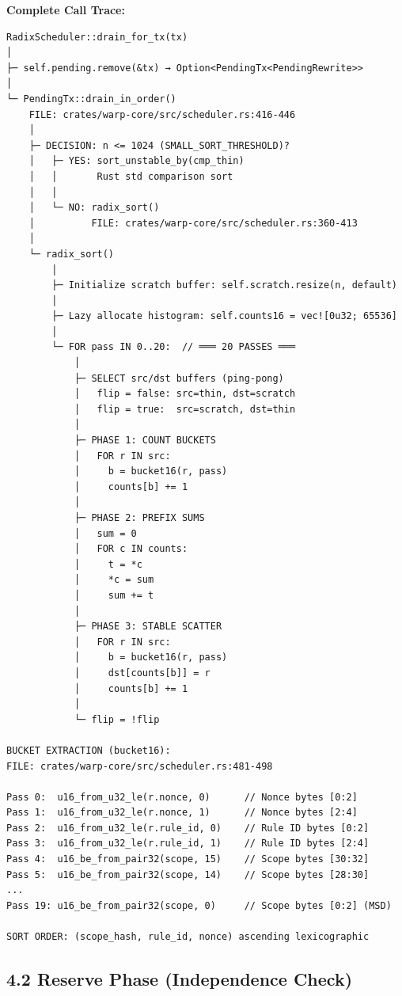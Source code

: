 \documentclass[
]{book}
\begin{document}
\textbf{Complete Call Trace:}

\begin{verbatim}
RadixScheduler::drain_for_tx(tx)
│
├─ self.pending.remove(&tx) → Option<PendingTx<PendingRewrite>>
│
└─ PendingTx::drain_in_order()
    FILE: crates/warp-core/src/scheduler.rs:416-446
    │
    ├─ DECISION: n <= 1024 (SMALL_SORT_THRESHOLD)?
    │   ├─ YES: sort_unstable_by(cmp_thin)
    │   │       Rust std comparison sort
    │   │
    │   └─ NO: radix_sort()
    │          FILE: crates/warp-core/src/scheduler.rs:360-413
    │
    └─ radix_sort()
        │
        ├─ Initialize scratch buffer: self.scratch.resize(n, default)
        │
        ├─ Lazy allocate histogram: self.counts16 = vec![0u32; 65536]
        │
        └─ FOR pass IN 0..20:  // ═══ 20 PASSES ═══
            │
            ├─ SELECT src/dst buffers (ping-pong)
            │   flip = false: src=thin, dst=scratch
            │   flip = true:  src=scratch, dst=thin
            │
            ├─ PHASE 1: COUNT BUCKETS
            │   FOR r IN src:
            │     b = bucket16(r, pass)
            │     counts[b] += 1
            │
            ├─ PHASE 2: PREFIX SUMS
            │   sum = 0
            │   FOR c IN counts:
            │     t = *c
            │     *c = sum
            │     sum += t
            │
            ├─ PHASE 3: STABLE SCATTER
            │   FOR r IN src:
            │     b = bucket16(r, pass)
            │     dst[counts[b]] = r
            │     counts[b] += 1
            │
            └─ flip = !flip

BUCKET EXTRACTION (bucket16):
FILE: crates/warp-core/src/scheduler.rs:481-498

Pass 0:  u16_from_u32_le(r.nonce, 0)      // Nonce bytes [0:2]
Pass 1:  u16_from_u32_le(r.nonce, 1)      // Nonce bytes [2:4]
Pass 2:  u16_from_u32_le(r.rule_id, 0)    // Rule ID bytes [0:2]
Pass 3:  u16_from_u32_le(r.rule_id, 1)    // Rule ID bytes [2:4]
Pass 4:  u16_be_from_pair32(scope, 15)    // Scope bytes [30:32]
Pass 5:  u16_be_from_pair32(scope, 14)    // Scope bytes [28:30]
...
Pass 19: u16_be_from_pair32(scope, 0)     // Scope bytes [0:2] (MSD)

SORT ORDER: (scope_hash, rule_id, nonce) ascending lexicographic
\end{verbatim}

\subsection{4.2 Reserve Phase (Independence
Check)}\label{reserve-phase-independence-check}
\end{document}
